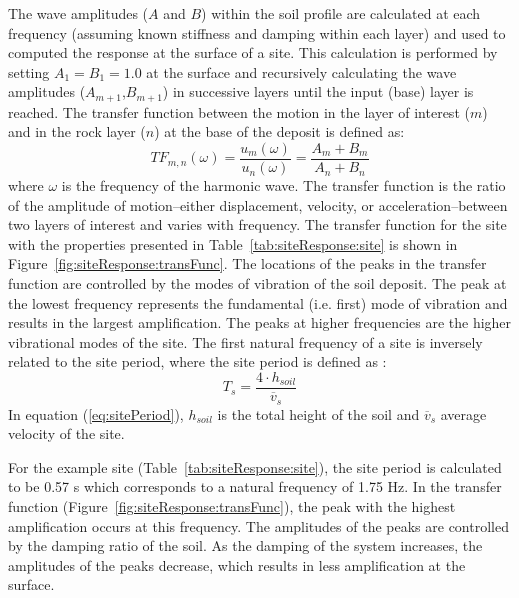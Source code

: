 \documentclass[12pt,oneside]{book}
\begin{document}
The wave amplitudes ($A$ and $B$) within the soil profile are calculated at each
frequency (assuming known stiffness and damping within each layer) and used to
computed the response at the surface of a site.  This calculation is performed
by setting $A_{1}=B_{1}=1.0$ at the surface and recursively calculating the wave
amplitudes ($A_{m+1}$,$B_{m+1}$) in successive layers until the input (base)
layer is reached.  The transfer function between the motion in the layer of
interest ($m$) and in the rock layer ($n$) at the base of the deposit is defined
as:
\begin{equation}
    TF_{m,n}(\omega) = \frac{u_m(\omega)}{u_n(\omega)}= \frac{A_m + B_m}{A_n + B_n}
    \label{eq:transFunc}
\end{equation}
where $\omega$ is the frequency of the harmonic wave.  The transfer function is
the ratio of the amplitude of motion--either displacement, velocity, or
acceleration--between two layers of interest and varies with frequency.  The
transfer function for the site with the properties presented in
Table~\ref{tab:siteResponse:site} is shown in
Figure~\ref{fig:siteResponse:transFunc}.  The locations of the peaks in the
transfer function are controlled by the modes of vibration of the soil deposit.
The peak at the lowest frequency represents the fundamental (i.e. first) mode of
vibration and results in the largest amplification.  The peaks at higher
frequencies are the higher vibrational modes of the site.  The first natural
frequency of a site is inversely related to the site period, where the site
period is defined as \citep{kramer:96}:
\begin{equation}
    T_s = \frac{4\cdot h_{soil}}{\overline{v}_s} %
    \label{eq:sitePeriod}
\end{equation}
In equation (\ref{eq:sitePeriod}), $h_{soil}$ is the total height of the soil
and $\overline{v}_s$ average velocity of the site.

For the example site (Table~\ref{tab:siteResponse:site}), the site period is
calculated to be 0.57 s which corresponds to a natural frequency of 1.75 Hz.  In
the transfer function (Figure~\ref{fig:siteResponse:transFunc}), the peak with
the highest amplification occurs at this frequency.  The amplitudes of the peaks
are controlled by the damping ratio of the soil. As the damping of the system
increases, the amplitudes of the peaks decrease, which results in less
amplification at the surface.
\end{document}
